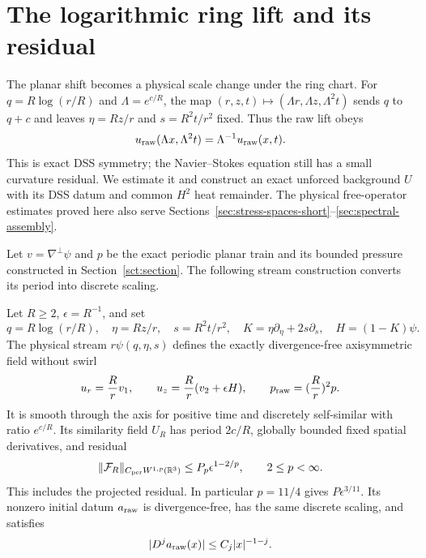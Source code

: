 \section{The logarithmic ring lift and its residual}
\label{sec:ring-lift}

The planar shift becomes a physical scale change under the ring chart.
For $q=R\log(r/R)$ and $\Lambda=e^{c/R}$, the map
$(r,z,t)\mapsto(\Lambda r,\Lambda z,\Lambda^2t)$ sends $q$ to $q+c$
and leaves $\eta=Rz/r$ and $s=R^2t/r^2$ fixed. Thus the raw lift obeys
\[
 u_{\rm raw}(\Lambda x,\Lambda^2t)=\Lambda^{-1}u_{\rm raw}(x,t).
\]
This is exact DSS symmetry; the Navier--Stokes equation still has a
small curvature residual. We estimate it and construct an exact unforced
background $U$ with its DSS datum and common $H^2$ heat remainder.
The physical free-operator estimates proved here also serve Sections~\ref{sec:stress-spaces-short}--\ref{sec:spectral-assembly}.

Let $v=\nabla^\perp\psi$ and $p$ be the exact periodic planar train
and its bounded pressure constructed in Section~\ref{sct:section}.
The following stream construction converts its period into discrete scaling.

\begin{proposition}
\label{sct:lift}
Let $R\geq2$, $\epsilon=R^{-1}$, and set
\[
 q=R\log(r/R),\quad\eta=Rz/r,\quad s=R^2t/r^2,
 \quad K=\eta\partial_\eta+2s\partial_s,\quad H=(1-K)\psi.
\]
The physical stream $r\psi(q,\eta,s)$ defines the exactly divergence-free
axisymmetric field without swirl
\[
 u_r=\frac Rrv_1,\qquad
 u_z=\frac Rr(v_2+\epsilon H),\qquad
 p_{\rm raw}=(\frac Rr)^2p.
\]
It is smooth through the axis for positive time and discretely
self-similar with ratio $e^{c/R}$. Its similarity field $U_R$ has
period $2c/R$, globally bounded fixed spatial derivatives, and residual
\begin{equation}
 \|\mathcal F_R\|_{C_{\rm per}W^{1,p}(\mathbb R^3)}
      \leq P_p\epsilon^{1-2/p},\qquad 2\leq p<\infty.
 \label{sct:residual-bound}
\end{equation}
This includes the projected residual. In particular $p=11/4$ gives
$P\epsilon^{3/11}$.
Its nonzero initial datum $a_{\rm raw}$ is divergence-free, has the same discrete
scaling, and satisfies
\begin{equation}
 |D^ja_{\rm raw}(x)|\leq C_j|x|^{-1-j}.
 \label{sct:raw-trace}
\end{equation}
\end{proposition}

